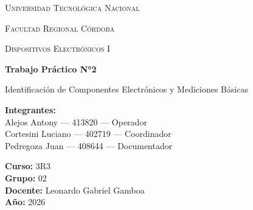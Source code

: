 \documentclass[12pt,a4paper]{report}
\begin{document}
\hypersetup{pageanchor=false}
\begin{titlepage}
    \centering

    {\scshape\LARGE Universidad Tecnológica Nacional \par}
    \vspace{0.3cm}
    {\scshape\Large Facultad Regional Córdoba \par}
    \vspace{1.5cm}

    {\scshape\Large Dispositivos Electrónicos I \par}
    \vspace{2cm}

    {\Huge\bfseries Trabajo Práctico N°2 \par}
    \vspace{0.5cm}
    {\LARGE Identificación de Componentes Electrónicos y
Mediciones Básicas \par}

    \vspace{2cm}

    \begin{flushleft}
    \textbf{Integrantes:} \\
    Alejos Antony --- 413820 --- Operador\\
    Cortesini Luciano --- 402719 --- Coordinador\\
    Pedregoza Juan --- 408644 --- Documentador\\

    \vspace{0.5cm}

    \textbf{Curso:} 3R3 \\
    \textbf{Grupo:} 02 \\
    \textbf{Docente:}  Leonardo Gabriel Gamboa\\
    \textbf{Año:} 2026 \\
    \end{flushleft}

    \vfill

\end{titlepage}
\hypersetup{pageanchor=true}
\thispagestyle{empty}

\pagestyle{fancy}

\vspace{1cm}

\tableofcontents
\newpage
 






 
\end{document}
